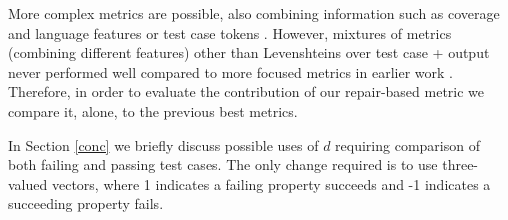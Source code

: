More complex metrics are possible, also combining information such as
coverage and language features or test case tokens \cite{PLDI13}.
However, mixtures of metrics (combining different features) other than
Levenshteins \cite{lev} over test case + output never performed well
compared to more focused metrics in earlier work \cite{PLDI13}.
Therefore, in order to evaluate the contribution of our repair-based
metric we compare it, alone, to the previous best metrics.

In Section \ref{conc} we briefly discuss possible uses of $d$
requiring comparison of both failing and passing test cases. The only
change required is to use three-valued vectors, where 1 indicates a failing property succeeds and -1 indicates a succeeding property fails.
